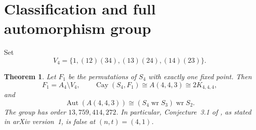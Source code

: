 \documentclass[11pt]{article}
\newcommand{\wprod}{\mathbin{\operatorname{wr}}}
\newtheorem{theorem}{Theorem}
\DeclareMathOperator{\Aut}{Aut}
\newcommand{\Cay}{\operatorname{Cay}}
\newcommand{\Vfour}{V_4}
\begin{document}
\section{Classification and full automorphism group}

Set
\[
 \Vfour=\{1,(12)(34),(13)(24),(14)(23)\}.
\]

\begin{theorem}\label{thm:main}
Let $F_1$ be the permutations of $S_4$ with exactly one fixed point.  Then
\[
 F_1=A_4\setminus V_4,
 \qquad
 \Cay(S_4,F_1)\cong A(4,4,3)\cong 2K_{4,4,4},
\]
and
\[
 \Aut(A(4,4,3))\cong (S_4\wprod S_3)\wprod S_2.
\]
The group has order $13{,}759{,}414{,}272$.  In particular,
Conjecture~3.1 of \cite{Pan2024}, as stated in arXiv version~1, is false
at $(n,t)=(4,1)$.
\end{theorem}
\end{document}
